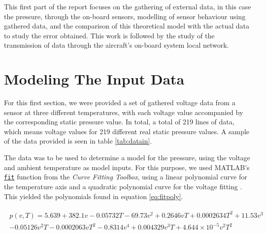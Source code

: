 \documentclass[english,palatino]{ist-report}
\begin{document}
This first part of the report focuses on the gathering of external data, in this case the pressure, through the on-board sensors, modelling of sensor behaviour using gathered data, and the comparison of this theoretical model with the actual data to study the error obtained. This work is followed by the study of the transmission of data through the aircraft's on-board system local network.

\section{Modeling The Input Data}

For this first section, we were provided a set of gathered voltage data from a sensor at three different temperatures, with each voltage value accompanied by the corresponding static pressure value. In total, a total of 219 lines of data, which means voltage values for 219 different real static pressure values. A sample of the data provided is seen in table \ref{tab:datain}.

\begin{table}[ht]
	\centering
	\caption{Example of the provided data formatting.}
	\label{tab:datain}
\end{table}

The data was to be used to determine a model for the pressure, using the voltage and ambient temperature as model inputs. For this purpose, we used MATLAB's \href{https://www.mathworks.com/help/curvefit/fit.html}{\texttt{fit}} function from the \textit{Curve Fitting Toolbox}, using a linear polynomial curve for the temperature axis and a quadratic polynomial curve for the voltage fitting . This yielded the polynomials found in equation \ref{eq:fitpoly}.

\begin{gather}\label{eq:fitpoly}
	\begin{split}
		p(v,T) = 5.639 + 382.1v - 0.05732T - 69.73v^2 + 0.2646vT + 0.0002634T^2 + 11.53v^3 \\ - 0.05126v^2T - 0.0002063vT^2 - 0.8314v^4 + 0.004329v^3T + 4.644\times10^{-5}v^2T^2
	\end{split}
\end{gather}
\end{document}
